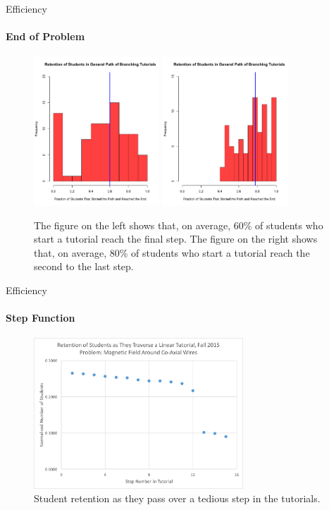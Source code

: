 \documentclass[xcolor=x11names,compress]{beamer}
\begin{document}
\begin{frame}{Efficiency}
	\framesubtitle{End of Problem}
	\begin{figure}
		\centering
		\includegraphics[width=0.42\textwidth]{img/retention_general.pdf}
		\includegraphics[width=0.42\textwidth]{img/retention_filtered.pdf}
		\caption{The figure on the left shows that, on average, 60\% of students who start a tutorial reach the final step. The figure on the right shows that, on average, 80\% of students who start a tutorial reach the second to the last step.}
		\label{fig:retention_examples}
	\end{figure}	
\end{frame}

\begin{frame}{Efficiency}
	\framesubtitle{Step Function}
	\begin{figure}
		\centering
		\includegraphics[width=0.7\textwidth]{img/step_function_1.png}
		\caption{Student retention as they pass over a tedious step in the tutorials.}
		\label{fig:step_function_examples}
	\end{figure}	
\end{frame}
\end{document}
